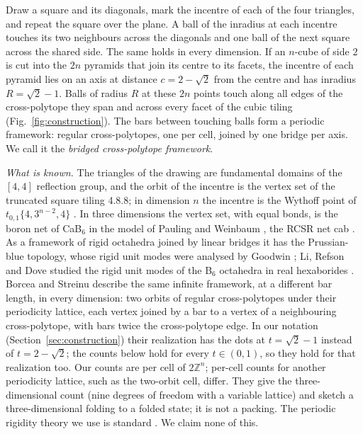 \documentclass[11pt]{amsart}
\theoremstyle{definition}
\theoremstyle{remark}
\newcommand{\Z}{\mathbb{Z}}
\begin{document}
Draw a square and its diagonals, mark the incentre of each of the four triangles, and repeat the square over the plane. A ball of the inradius at each incentre touches its two neighbours across the diagonals and one ball of the next square across the shared side. The same holds in every dimension. If an $n$-cube of side $2$ is cut into the $2n$ pyramids that join its centre to its facets, the incentre of each pyramid lies on an axis at distance $c=2-\sqrt2$ from the centre and has inradius $R=\sqrt2-1$. Balls of radius $R$ at these $2n$ points touch along all edges of the cross-polytope they span and across every facet of the cubic tiling (Fig.~\ref{fig:construction}). The bars between touching balls form a periodic framework: regular cross-polytopes, one per cell, joined by one bridge per axis. We call it the \emph{bridged cross-polytope framework}.

\emph{What is known.} The triangles of the drawing are fundamental domains of the $[4,4]$ reflection group, and the orbit of the incentre is the vertex set of the truncated square tiling 4.8.8; in dimension $n$ the incentre is the Wythoff point of $t_{0,1}\{4,3^{n-2},4\}$ \cite{Coxeter1973,ConwayBurgielGS2008,GrunbaumShephard1987}. In three dimensions the vertex set, with equal bonds, is the boron net of CaB$_6$ in the model of Pauling and Weinbaum \cite{PaulingWeinbaum1934}, the RCSR net \textsf{cab} \cite{OKeeffe2008RCSR,RCSR,DelgadoFriedrichs2003}. As a framework of rigid octahedra joined by linear bridges it has the Prussian-blue topology, whose rigid unit modes were analysed by Goodwin \cite{Goodwin2006}; Li, Refson and Dove studied the rigid unit modes of the B$_6$ octahedra in real hexaborides \cite{LiRefsonDove2023}. Borcea and Streinu \cite[Section~7]{BorceaStreinu2021} describe the same infinite framework, at a different bar length, in every dimension: two orbits of regular cross-polytopes under their periodicity lattice, each vertex joined by a bar to a vertex of a neighbouring cross-polytope, with bars twice the cross-polytope edge. In our notation (Section~\ref{sec:construction}) their realization has the dots at $t=\sqrt2-1$ instead of $t=2-\sqrt2$; the counts below hold for every $t\in(0,1)$, so they hold for that realization too. Our counts are per cell of $2\Z^n$; per-cell counts for another periodicity lattice, such as the two-orbit cell, differ. They give the three-dimensional count (nine degrees of freedom with a variable lattice) and sketch a three-dimensional folding to a folded state; it is not a packing. The periodic rigidity theory we use is standard \cite{BorceaStreinu2010,MalesteinTheran2013,Power2014}. We claim none of this.
\end{document}
